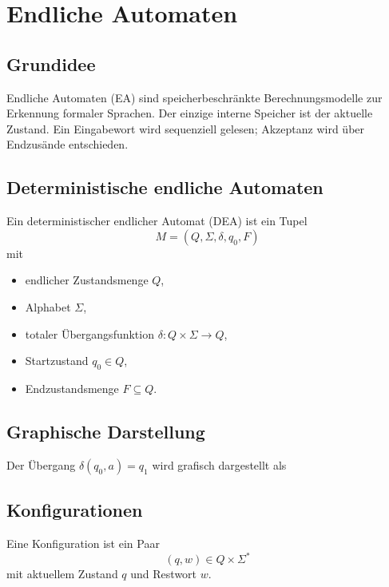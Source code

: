 \section{Endliche Automaten}

\subsection{Grundidee}
Endliche Automaten (EA) sind speicherbeschränkte Berechnungsmodelle zur Erkennung formaler Sprachen.
Der einzige interne Speicher ist der aktuelle Zustand.
Ein Eingabewort wird sequenziell gelesen; Akzeptanz wird über Endzusände entschieden.

\subsection{Deterministische endliche Automaten}
Ein deterministischer endlicher Automat (DEA) ist ein Tupel
\[
    M = (Q, \Sigma, \delta, q_0, F)
\]
mit
\begin{itemize}
    \item endlicher Zustandsmenge \(Q\),
    \item Alphabet \(\Sigma\),
    \item totaler Übergangsfunktion \(\delta : Q \times \Sigma \to Q\),
    \item Startzustand \(q_0 \in Q\),
    \item Endzustandsmenge \(F \subseteq Q\).
\end{itemize}

\subsection{Graphische Darstellung}
Der Übergang \(\delta(q_0, a) = q_1\) wird grafisch dargestellt als\\
\begin{center}
\end{center}

\subsection{Konfigurationen}
Eine Konfiguration ist ein Paar
\[
    (q,w) \in Q \times \Sigma^*
\]
mit aktuellem Zustand \(q\) und Restwort \(w\).

